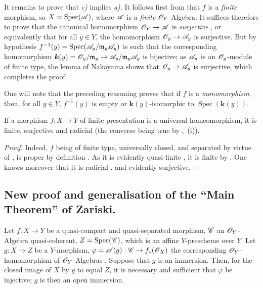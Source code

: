 It remains to prove that \emph{c)} implies \emph{a)}.
It follows first from  that $f$ is a \emph{finite} morphism, so $X=\operatorname{Spec}(\mathscr{A})$, where $\mathscr{A}$ is a \emph{finite} $\mathscr{O}_Y$-Algebra.
It suffices therefore to prove that the canonical homomorphism $\mathscr{O}_Y\to\mathscr{A}$ is \emph{surjective} , or equivalently that for all $y\in Y$, the homomorphism $\mathscr{O}_y\to\mathscr{A}_y$ is surjective.
But by hypothesis
$f^{-1}(y)=\operatorname{Spec}(\mathscr{A}_y/\mathfrak{m}_y\mathscr{A}_y)$  is such that the corresponding homomorphism $\boldsymbol{k}(y)=\mathscr{O}_y/\mathfrak{m}_y\to\mathscr{A}_y/\mathfrak{m}_y\mathscr{A}_y$ is bijective; as $\mathscr{A}_y$ is an $\mathscr{O}_y$-module of finite type, the lemma of Nakayama shows that $\mathscr{O}_y\to\mathscr{A}_y$ is surjective, which completes the proof.

\begin{remark}[8.11.5.1]
\label{IV.8.11.5.1}
One will note that the preceding reasoning proves that if $f$ is a \emph{monomorphism}, then, for all $y\in Y$, $f^{-1}(y)$ is empty or $\boldsymbol{k}(y)$-isomorphic to $\operatorname{Spec}(\boldsymbol{k}(y))$.
\end{remark}

\begin{proposition}[8.11.6]
\label{IV.8.11.6}
If a morphism $f:X\to Y$ of finite presentation is a universal homeomorphism, it is finite, surjective and radicial \textup{(the converse being true by ,~(i))}.
\end{proposition}

\begin{proof}
Indeed, $f$ being of finite type, universally closed, and separated by virtue of , is proper by definition .
As it is evidently quasi-finite , it is finite by .
One knows moreover that it is radicial , and evidently surjective.
\end{proof}

\subsection{New proof and generalisation of the ``Main Theorem'' of Zariski.}
\label{subsection:IV.8.12}
\label{IV.8.12}

\begin{lemma}[8.12.1]
\label{IV.8.12.1}
Let $f:X\to Y$ be a quasi-compact and quasi-separated morphism, $\mathscr{C}$ an $\mathscr{O}_Y$-Algebra quasi-coherent, $Z=\operatorname{Spec}(\mathscr{C})$, which is an affine $Y$-prescheme over $Y$.
Let $g:X\to Z$ be a $Y$-morphism, $\varphi=\mathscr{A}(g):\mathscr{C}\to f_*(\mathscr{O}_X)$ the corresponding $\mathscr{O}_Y$-homomorphism of $\mathscr{O}_Y$-Algebras .
Suppose that $g$ is an immersion.
Then, for the closed image of $X$ by $g$  to equal $Z$, it is necessary and sufficient that $\varphi$ be injective; $g$ is then an open immersion.
\end{lemma}

